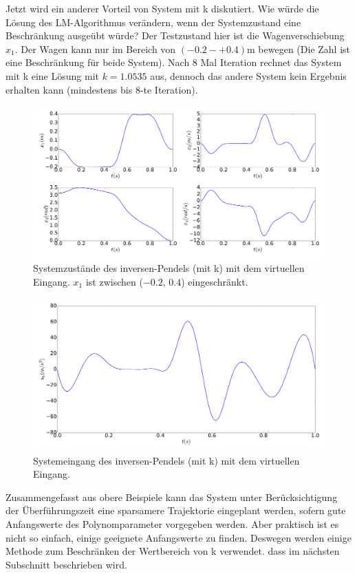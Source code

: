\begin{beispiel}
	Jetzt wird ein anderer Vorteil von System mit k diskutiert. Wie würde die Lösung des LM-Algorithmus verändern, wenn der Systemzustand eine Beschränkung ausgeübt würde? Der Testzustand hier ist die Wagenverschiebung $x_{1}$. Der Wagen kann nur im Bereich von $(-0.2-+0.4)$m bewegen (Die Zahl ist eine Beschränkung für beide System). Nach 8 Mal Iteration rechnet das System mit k eine Lösung mit $k=1.0535$ aus, dennoch das andere System kein Ergebnis erhalten kann (mindestens bis 8-te Iteration).
	
	\begin{figure}
		\centering
		\includegraphics[width=15.5cm]{bild/30_32/example0_mit_k_x_con.pdf}
		\caption{Systemzustände des inversen-Pendels (mit k) mit dem virtuellen Eingang. $x_{1}$ ist zwischen ($-0.2$, $0.4$) eingeschränkt.}
		\label{fig:Inverses_Pendel_mit_k_x_con}
	\end{figure}
	
	\begin{figure}
		\centering
		\includegraphics[width=12cm]{bild/30_32/example0_mit_k_u_con.pdf}
		\caption{Systemeingang des inversen-Pendels (mit k) mit dem virtuellen Eingang.}
		\label{fig:Inverses_Pendel_mit_k_u_con}
	\end{figure}

\end{beispiel}
\newpage
Zusammengefasst aus obere Beispiele kann das System unter Berücksichtigung der Überführungszeit eine sparsamere Trajektorie eingeplant werden, sofern gute Anfangswerte des Polynomparameter vorgegeben werden. Aber praktisch ist es nicht so einfach, einige geeignete Anfangswerte zu finden. Deswegen werden einige Methode zum Beschränken der Wertbereich von k verwendet. dass im nächsten Subschnitt beschrieben wird. %
